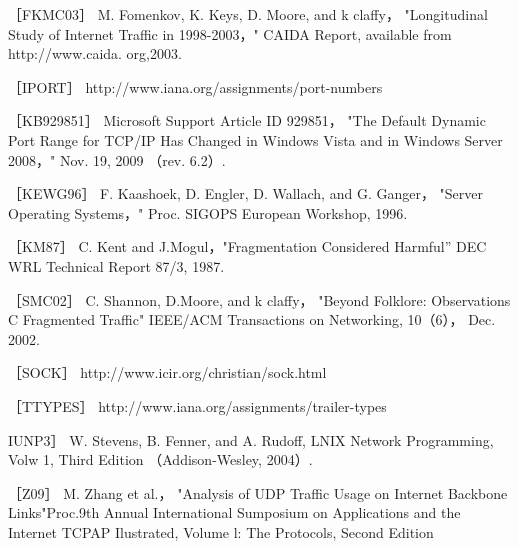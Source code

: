 ［FKMC03］ M. Fomenkov, K. Keys, D. Moore, and k claffy， "Longitudinal Study of
Internet Traffic in 1998-2003，" CAIDA Report, available from http://www.caida.
org,2003.

［IPORT］ http://www.iana.org/assignments/port-numbers

［KB929851］ Microsoft Support Article ID 929851， "The Default Dynamic Port
Range for TCP/IP Has Changed in Windows Vista and in Windows Server 2008，"
Nov. 19, 2009 （rev. 6.2）.

［KEWG96］ F. Kaashoek, D. Engler, D. Wallach, and G. Ganger， "Server Operating
Systems，" Proc. SIGOPS European Workshop, 1996.

［KM87］ C. Kent and J.Mogul，"Fragmentation Considered Harmful” DEC WRL
Technical Report 87/3, 1987.

［SMC02］ C. Shannon, D.Moore, and k claffy， "Beyond Folklore: Observations C
Fragmented Traffic" IEEE/ACM Transactions on Networking, 10（6）， Dec. 2002.

［SOCK］ http://www.icir.org/christian/sock.html

［TTYPES］ http://www.iana.org/assignments/trailer-types

IUNP3］ W. Stevens, B. Fenner, and A. Rudoff, LNIX Network Programming, Volw
1, Third Edition （Addison-Wesley, 2004）.

［Z09］ M. Zhang et al.， "Analysis of UDP Traffic Usage on Internet Backbone
Links"Proc.9th Annual International Sumposium on Applications and the Internet
TCPAP Ilustrated, Volume l: The Protocols, Second Edition
